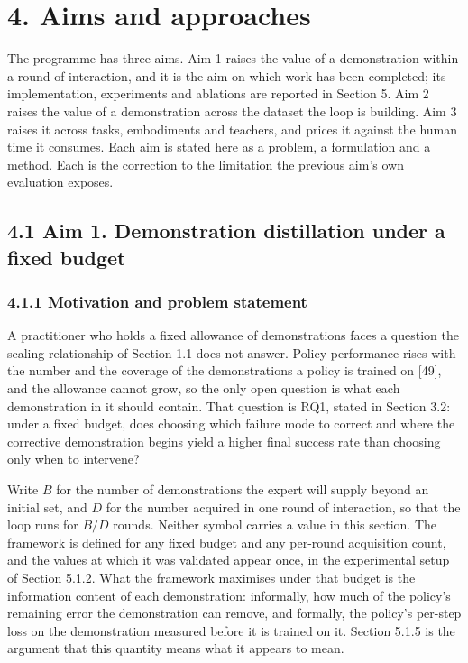 \documentclass[
  11pt,
]{article}
\begin{document}
\hypertarget{aims-and-approaches}{%
\section{4. Aims and approaches}\label{aims-and-approaches}}

The programme has three aims. Aim 1 raises the value of a demonstration
within a round of interaction, and it is the aim on which work has been
completed; its implementation, experiments and ablations are reported in
Section 5. Aim 2 raises the value of a demonstration across the dataset
the loop is building. Aim 3 raises it across tasks, embodiments and
teachers, and prices it against the human time it consumes. Each aim is
stated here as a problem, a formulation and a method. Each is the
correction to the limitation the previous aim's own evaluation exposes.

\hypertarget{aim-1.-demonstration-distillation-under-a-fixed-budget}{%
\subsection{4.1 Aim 1. Demonstration distillation under a fixed
budget}\label{aim-1.-demonstration-distillation-under-a-fixed-budget}}

\hypertarget{motivation-and-problem-statement}{%
\subsubsection{4.1.1 Motivation and problem
statement}\label{motivation-and-problem-statement}}

A practitioner who holds a fixed allowance of demonstrations faces a
question the scaling relationship of Section 1.1 does not answer. Policy
performance rises with the number and the coverage of the demonstrations
a policy is trained on {[}49{]}, and the allowance cannot grow, so the
only open question is what each demonstration in it should contain. That
question is RQ1, stated in Section 3.2: under a fixed budget, does
choosing which failure mode to correct and where the corrective
demonstration begins yield a higher final success rate than choosing
only when to intervene?

Write \(B\) for the number of demonstrations the expert will supply
beyond an initial set, and \(D\) for the number acquired in one round of
interaction, so that the loop runs for \(B/D\) rounds. Neither symbol
carries a value in this section. The framework is defined for any fixed
budget and any per-round acquisition count, and the values at which it
was validated appear once, in the experimental setup of Section 5.1.2.
What the framework maximises under that budget is the information
content of each demonstration: informally, how much of the policy's
remaining error the demonstration can remove, and formally, the policy's
per-step loss on the demonstration measured before it is trained on it.
Section 5.1.5 is the argument that this quantity means what it appears
to mean.
\end{document}
